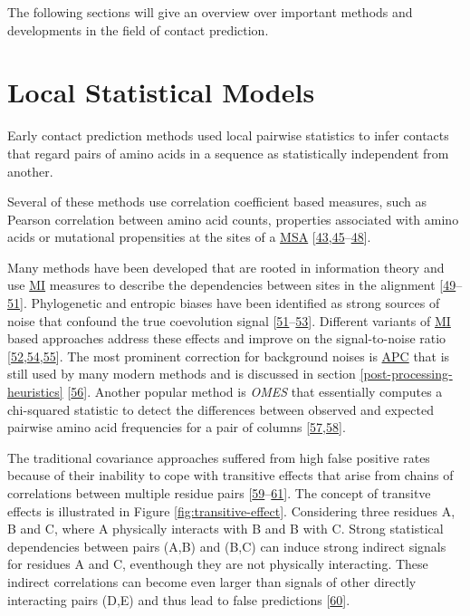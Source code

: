 \documentclass[11pt,a4paper,twoside]{book}
\theoremstyle{definition}
\theoremstyle{definition}
\theoremstyle{remark}
\begin{document}
The following sections will give an overview over important methods and
developments in the field of contact prediction.

\section{Local Statistical Models}\label{local-methods}

Early contact prediction methods used local pairwise statistics to infer
contacts that regard pairs of amino acids in a sequence as statistically
independent from another.

Several of these methods use correlation coefficient based measures,
such as Pearson correlation between amino acid counts, properties
associated with amino acids or mutational propensities at the sites of a
\protect\hyperlink{abbrev}{MSA}
{[}\protect\hyperlink{ref-Gobel1994}{43},\protect\hyperlink{ref-Neher1994}{45}--\protect\hyperlink{ref-Shindyalov1994}{48}{]}.

Many methods have been developed that are rooted in information theory
and use \protect\hyperlink{abbrev}{MI} measures to describe the
dependencies between sites in the alignment
{[}\protect\hyperlink{ref-Clarke1995}{49}--\protect\hyperlink{ref-Martin2005}{51}{]}.
Phylogenetic and entropic biases have been identified as strong sources
of noise that confound the true coevolution signal
{[}\protect\hyperlink{ref-Martin2005}{51}--\protect\hyperlink{ref-Fodor2004}{53}{]}.
Different variants of \protect\hyperlink{abbrev}{MI} based approaches
address these effects and improve on the signal-to-noise ratio
{[}\protect\hyperlink{ref-Atchley2000}{52},\protect\hyperlink{ref-Tillier2003}{54},\protect\hyperlink{ref-Gouveia_Oliveira2007}{55}{]}.
The most prominent correction for background noises is
\protect\hyperlink{abbrev}{APC} that is still used by many modern
methods and is discussed in section \ref{post-processing-heuristics}
{[}\protect\hyperlink{ref-Dunn2008}{56}{]}. Another popular method is
\emph{OMES} that essentially computes a chi-squared statistic to detect
the differences between observed and expected pairwise amino acid
frequencies for a pair of columns
{[}\protect\hyperlink{ref-Kass2002}{57},\protect\hyperlink{ref-Noivirt2005}{58}{]}.

The traditional covariance approaches suffered from high false positive
rates because of their inability to cope with transitive effects that
arise from chains of correlations between multiple residue pairs
{[}\protect\hyperlink{ref-Lapedes1999}{59}--\protect\hyperlink{ref-Weigt2009}{61}{]}.
The concept of transitve effects is illustrated in Figure
\ref{fig:transitive-effect}. Considering three residues A, B and C,
where A physically interacts with B and B with C. Strong statistical
dependencies between pairs (A,B) and (B,C) can induce strong indirect
signals for residues A and C, eventhough they are not physically
interacting. These indirect correlations can become even larger than
signals of other directly interacting pairs (D,E) and thus lead to false
predictions {[}\protect\hyperlink{ref-Burger2010}{60}{]}.
\end{document}
